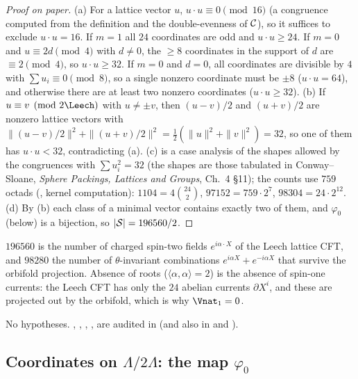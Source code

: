 \begin{proof}[Proof on paper]
(a) For a lattice vector $u$, $u\cdot u\equiv0\pmod{16}$ (a congruence computed from the
definition and the double-evenness of $\mathcal{C}$), so it suffices to exclude $u\cdot u=16$.  If $m=1$
all $24$ coordinates are odd and $u\cdot u\ge24$.  If $m=0$ and $u\equiv2d\pmod4$ with $d\ne0$, the
$\ge8$ coordinates in the support of $d$ are $\equiv2\pmod4$, so $u\cdot u\ge32$.  If $m=0$ and $d=0$,
all coordinates are divisible by $4$ with $\sum u_i\equiv0\pmod8$, so a single nonzero coordinate must
be $\pm8$ ($u\cdot u=64$), and otherwise there are at least two nonzero coordinates
($u\cdot u\ge32$).  (b) If $u\equiv v\pmod{2\Leech}$ with $u\neq\pm v$, then $(u-v)/2$ and $(u+v)/2$ are
nonzero lattice vectors with $\|(u-v)/2\|^2+\|(u+v)/2\|^2=\tfrac12(\|u\|^2+\|v\|^2)=32$, so one of them
has $u\cdot u<32$, contradicting (a).  (c) is a case analysis of the shapes allowed by the
congruences with $\sum u_i^2=32$ (the shapes are those tabulated in Conway--Sloane, \emph{Sphere
Packings, Lattices and Groups}, Ch.~4 \S11); the counts use $759$ octads (, kernel computation):
$1104=4\binom{24}2$, $97152=759\cdot2^7$, $98304=24\cdot2^{12}$.  (d) By (b) each class of a minimal
vector contains exactly two of them, and $\varphi_0$ (below) is a bijection, so $|\mathcal{S}|=196560/2$.
\end{proof}
\begin{physics}
$196560$ is the number of charged spin-two fields $e^{i\alpha\cdot X}$ of the Leech lattice CFT, and
$98280$ the number of $\theta$-invariant combinations $e^{i\alpha X}+e^{-i\alpha X}$ that survive the
orbifold projection.  Absence of roots ($\langle\alpha,\alpha\rangle=2$) is the absence of
spin-one currents: the Leech CFT has only the $24$ abelian currents $\partial X^i$, and these are
projected out by the orbifold, which is why $\Vnat_1=0$.
\end{physics}
\begin{status}
No hypotheses.  , , , ,
 are audited in  (and  also in
 and ).
\end{status}

\subsection{Coordinates on \texorpdfstring{$\Lambda/2\Lambda$}{Lambda/2Lambda}: the map \texorpdfstring{$\varphi_0$}{phi0}}

